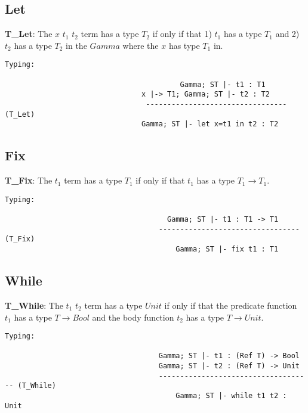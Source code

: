 \subsection{Let}
\textbf{T_Let}: The \lt $x$ $t_1$ $t_2$ term has a type $T_2$  if only if that 1) $t_1$ has a type $T_1$ and 2) $t_2$ has a type $T_2$ in the $Gamma$ where the $x$ has type $T_1$ in.
\begin{lstlisting}
Typing:

										 Gamma; ST |- t1 : T1
								x |-> T1; Gamma; ST |- t2 : T2
								 ---------------------------------   (T_Let)
								Gamma; ST |- let x=t1 in t2 : T2
\end{lstlisting}

\subsection{Fix}
\textbf{T_Fix}: The \fix $t_1$ term has a type $T_1$ if only if that $t_1$ has a type $T_1 \rightarrow T_1$.
\begin{lstlisting}
Typing:

									  Gamma; ST |- t1 : T1 -> T1
									---------------------------------   (T_Fix)
									 	Gamma; ST |- fix t1 : T1
\end{lstlisting}

\subsection{While}
\textbf{T_While}: The \while $t_1$ $t_2$ term has a type $Unit$ if only if that the predicate function $t_1$ has a type $T \rightarrow Bool$ and the body function $t_2$ has a type $T \rightarrow Unit$.
\begin{lstlisting}
Typing:

									Gamma; ST |- t1 : (Ref T) -> Bool
									Gamma; ST |- t2 : (Ref T) -> Unit
									------------------------------------ (T_While)
										Gamma; ST |- while t1 t2 : Unit
\end{lstlisting}


